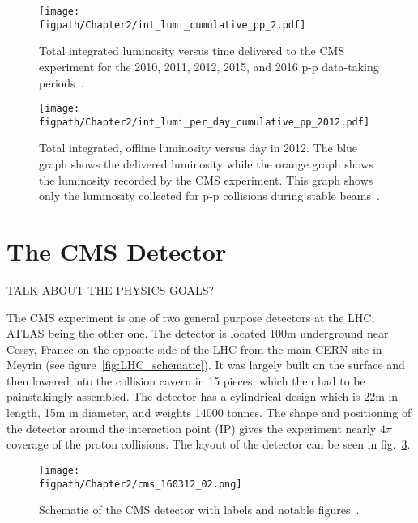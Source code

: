 \begin{figure}[!hbt]
	\centering
	\texttt{[image: \\figpath/Chapter2/int\_lumi\_cumulative\_pp\_2.pdf]}
	\caption{Total integrated luminosity versus time delivered to the CMS experiment for the 2010, 2011, 2012, 2015, and 2016 p-p data-taking periods~\cite{LumiPublic}.}
	\label{fig:LHC_int_lumi_pp}
\end{figure}

\begin{figure}[!hbt]
	\centering
	\texttt{[image: \\figpath/Chapter2/int\_lumi\_per\_day\_cumulative\_pp\_2012.pdf]}
	\caption{Total integrated, offline luminosity versus day in 2012. The blue graph shows the delivered luminosity while the orange graph shows the luminosity recorded by the CMS experiment. This graph shows only the luminosity collected for p-p collisions during stable beams~\cite{LumiPublic}.}
	\label{fig:LHC_lumi_per_day_pp}
\end{figure}


\section{The CMS Detector}

TALK ABOUT THE PHYSICS GOALS?

The CMS experiment is one of two general purpose detectors at the LHC; ATLAS being the other one.
The detector is located 100\unit{m} underground near Cessy, France on the opposite side of the LHC from the main CERN site in Meyrin (see figure~\ref{fig:LHC_schematic}).
It was largely built on the surface and then lowered into the collision cavern in 15 pieces, which then had to be painstakingly assembled.
The detector has a cylindrical design which is 22\unit{m} in length, 15\unit{m} in diameter, and weights 14000 tonnes.
The shape and positioning of the detector around the interaction point (IP) gives the experiment nearly $4\pi$ coverage of the proton collisions.
The layout of the detector can be seen in fig.~\ref{fig:CMS_schematic}.

\begin{figure}[!hbt]
	\centering
	\texttt{[image: \\figpath/Chapter2/cms\_160312\_02.png]}
	\caption{Schematic of the CMS detector with labels and notable figures~\cite{SketchUpCMS}.}
	\label{fig:CMS_schematic}
\end{figure}

